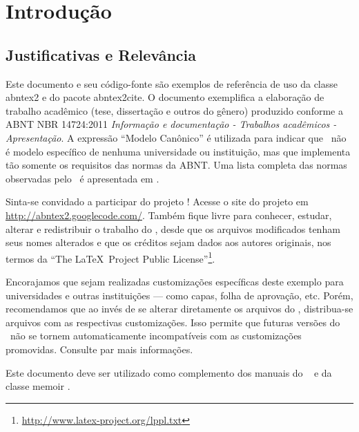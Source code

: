 \chapter[Introdução]{Introdução}

\section{Justificativas e Relev{\^a}ncia}
%
Este documento e seu código-fonte são exemplos de referência de uso da classe
\textsf{abntex2} e do pacote \textsf{abntex2cite}. O documento 
exemplifica a elaboração de trabalho acadêmico (tese, dissertação e outros do
gênero) produzido conforme a ABNT NBR 14724:2011 \emph{Informação e documentação
- Trabalhos acadêmicos - Apresentação}.
A expressão ``Modelo Canônico'' é utilizada para indicar que \abnTeX\ não é
modelo específico de nenhuma universidade ou instituição, mas que implementa tão
somente os requisitos das normas da ABNT. Uma lista completa das normas
observadas pelo \abnTeX\ é apresentada em .

Sinta-se convidado a participar do projeto \abnTeX! Acesse o site do projeto em
\url{http://abntex2.googlecode.com/}. Também fique livre para conhecer,
estudar, alterar e redistribuir o trabalho do \abnTeX, desde que os arquivos
modificados tenham seus nomes alterados e que os créditos sejam dados aos
autores originais, nos termos da ``The \LaTeX\ Project Public
License''\footnote{\url{http://www.latex-project.org/lppl.txt}}.

Encorajamos que sejam realizadas customizações específicas deste exemplo para
universidades e outras instituições --- como capas, folha de aprovação, etc.
Porém, recomendamos que ao invés de se alterar diretamente os arquivos do
\abnTeX, distribua-se arquivos com as respectivas customizações.
Isso permite que futuras versões do \abnTeX~não se tornem automaticamente
incompatíveis com as customizações promovidas. Consulte
 par mais informações.

Este documento deve ser utilizado como complemento dos manuais do \abnTeX\ 
\cite{abntex2classe,abntex2cite,abntex2cite-alf} e da classe \textsf{memoir}
\cite{memoir}. 

